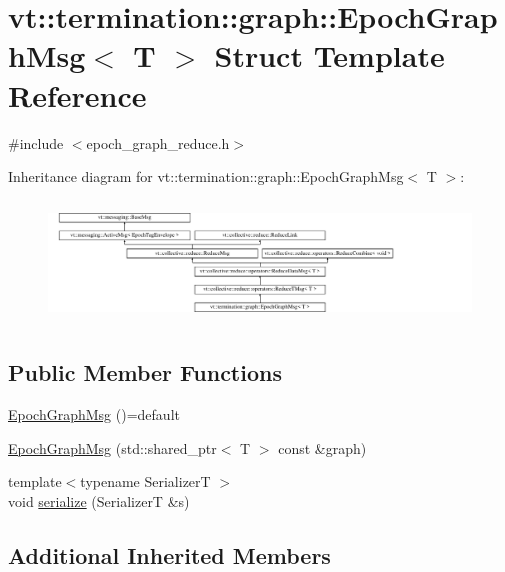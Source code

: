 \hypertarget{structvt_1_1termination_1_1graph_1_1_epoch_graph_msg}{}\section{vt\+:\+:termination\+:\+:graph\+:\+:Epoch\+Graph\+Msg$<$ T $>$ Struct Template Reference}
\label{structvt_1_1termination_1_1graph_1_1_epoch_graph_msg}


{\ttfamily \#include $<$epoch\+\_\+graph\+\_\+reduce.\+h$>$}

Inheritance diagram for vt\+:\+:termination\+:\+:graph\+:\+:Epoch\+Graph\+Msg$<$ T $>$\+:\begin{figure}[H]
\begin{center}
\leavevmode
\includegraphics[height=3.274854cm]{structvt_1_1termination_1_1graph_1_1_epoch_graph_msg}
\end{center}
\end{figure}
\subsection*{Public Member Functions}
\begin{DoxyCompactItemize}
\item 
\hyperlink{structvt_1_1termination_1_1graph_1_1_epoch_graph_msg_a7dd7c3313549d4d61f614bc1ec38a13b}{Epoch\+Graph\+Msg} ()=default
\item 
\hyperlink{structvt_1_1termination_1_1graph_1_1_epoch_graph_msg_a3d594c68531bdbc1b114f4b52557d648}{Epoch\+Graph\+Msg} (std\+::shared\+\_\+ptr$<$ T $>$ const \&graph)
\item 
{\footnotesize template$<$typename SerializerT $>$ }\\void \hyperlink{structvt_1_1termination_1_1graph_1_1_epoch_graph_msg_af799d374db4de6b194128e4032e3d412}{serialize} (SerializerT \&s)
\end{DoxyCompactItemize}
\subsection*{Additional Inherited Members}


